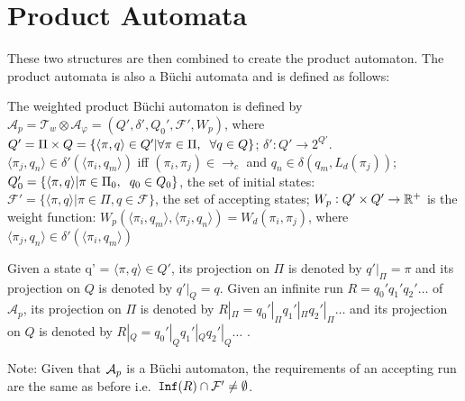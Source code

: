 \section{Product Automata}
These two structures are then combined to create the product automaton. The product automata is also a B\"{u}chi automata and is defined as follows:
\begin{definition}
The weighted product B\"{u}chi automaton is defined by $\mathcal{A}_p = \mathcal{T}_w \otimes \mathcal{A}_\varphi = (Q', \delta', Q_0', \mathcal{F}', W_p)$, where $Q' = \Pi \times Q = \{ \langle \pi, q \rangle \in Q' | \forall \pi \in \Pi, \hspace{0.2cm} \forall q \in Q \}$; $\delta': Q' \rightarrow 2^{Q'}$. $\langle \pi_j, q_n \rangle \in \delta' (\langle \pi_i, q_m \rangle )$ iff $(\pi_i , \pi_j ) \in \rightarrow_c$ and $q_n \in \delta (q_m, L_d(\pi_j))$; $Q_0' = \{ \langle \pi , q \rangle | \pi \in \Pi_0, \hspace{0.2cm} q_0 \in Q_0\}$, the set of initial states: $\mathcal{F}' = \{ \langle \pi, q \rangle | \pi \in \Pi, q \in \mathcal{F}\}$, the set of accepting states; $W_p: Q' \times Q' \rightarrow \mathbb{R}^+$ is the weight function: $W_p(\langle \pi_i, q_m \rangle , \langle \pi_j, q_n \rangle ) = W_d (\pi_i, \pi_j)$, where $\langle \pi_j, q_n \rangle \in \delta' ( \langle \pi_i, q_m \rangle )$
\end{definition} 

Given a state q' = $\langle \pi, q \rangle \in Q'$, its projection on $\Pi$ is denoted by $q'|_\Pi = \pi$ and its projection on $Q$ is denoted by $q'|_Q = q$. Given an infinite run $R = q_0' q_1' q_2' \dots$ of $\mathcal{A}_p$, its projection on $\Pi$ is denoted by $R|_\Pi = q_0'|_\Pi q_1'|_\Pi q_2'|_\Pi \dots$ and its projection on $Q$ is denoted by $R|_Q  = q_0'|_Q q_1'|_Q q_2'|_Q \dots$ \cite{guo15}. 

Note: Given that $\mathcal{A}_p$ is a B\"{u}chi automaton, the requirements of an accepting run are the same as before i.e.\ $\texttt{Inf}(R) \cap \mathcal{F}' \neq \emptyset$.

%
%


